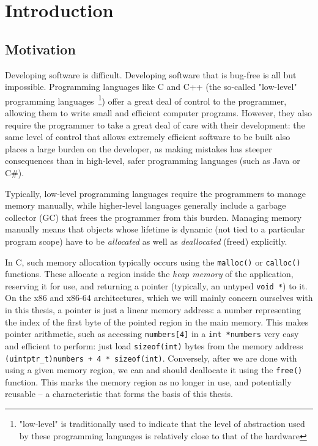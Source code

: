 \chapter{Introduction}
\label{ch:intro}

\section{Motivation}

Developing software is difficult. Developing software that is bug-free is all but impossible. Programming languages like C and C++ (the so-called "low-level" programming languages~\footnote{"low-level" is traditionally used to indicate that the level of abstraction used by these  programming languages is relatively close to that of the hardware}) offer a great deal of control to the programmer, allowing them to write small and efficient computer programs. However, they also require the programmer to take a great deal of care with their development: the same level of control that allows extremely efficient software to be built also places a large burden on the developer, as making mistakes has steeper consequences than in high-level, safer programming languages (such as Java or C\#).

Typically, low-level programming languages require the programmers to manage memory manually, while higher-level languages generally include a garbage collector (GC) that frees the programmer from this burden. Managing memory manually means that objects whose lifetime is dynamic (not tied to a particular program scope) have to be \emph{allocated} as well as \emph{deallocated} (freed) explicitly.

In C, such memory allocation typically occurs using the \lstinline!malloc()! or \lstinline!calloc()! functions. These allocate a region inside the \emph{heap memory} of the application, reserving it for use, and returning a pointer (typically, an untyped \lstinline!void *!) to it. On the x86 and x86-64 architectures, which we will mainly concern ourselves with in this thesis, a pointer is just a linear memory address: a number representing the index of the first byte of the pointed region in the main memory. This makes pointer arithmetic, such as accessing \lstinline!numbers[4]! in a \lstinline!int *numbers! very easy and efficient to perform: just load \lstinline!sizeof(int)! bytes from the memory address \lstinline!(uintptr_t)numbers + 4 * sizeof(int)!. Conversely, after we are done with using a given memory region, we can and should deallocate it using the \lstinline!free()! function. This marks the memory region as no longer in use, and potentially reusable -- a characteristic that forms the basis of this thesis.

